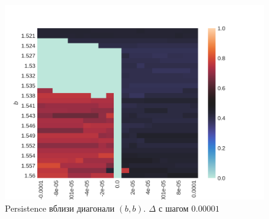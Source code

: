 \documentclass[12pt]{article}
\begin{document}
        \begin{figure}[H]
            \centering
            \includegraphics[width=0.95\columnwidth, keepaspectratio=True]{DoubleField/persistence_chaos_small.png}
            \caption{Persistence вблизи диагонали $(b, b)$. $\Delta$ с шагом $0.00001$}
            \label{fig:chaos_pers_small}
        \end{figure}
\end{document}
